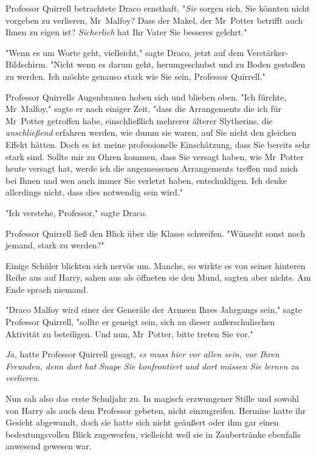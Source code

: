 {Professor Quirrell betrachtete Draco ernsthaft. "\emph{Sie} sorgen sich, Sie könnten nicht vorgeben zu verlieren, Mr~Malfoy? Dass der Makel, der Mr~Potter betrifft auch Ihnen zu eigen ist? \emph{Sicherlich} hat Ihr Vater Sie besseres gelehrt."

"Wenn es um Worte geht, vielleicht," sagte Draco, jetzt auf dem Verstärker-Bildschirm. "Nicht wenn es darum geht, herumgeschubst und zu Boden gestoßen zu werden. Ich möchte genauso stark wie Sie sein, Professor Quirrell."

Professor Quirrells Augenbrauen hoben sich und blieben oben. "Ich fürchte, Mr~Malfoy," sagte er nach einiger Zeit, "dass die Arrangements die ich für Mr~Potter getroffen habe, einschließlich mehrerer älterer Slytherins, die \emph{anschließend} erfahren werden, wie dumm sie waren, auf Sie nicht den gleichen Effekt hätten. Doch es ist meine professionelle Einschätzung, dass Sie bereits sehr stark sind. Sollte mir zu Ohren kommen, dass Sie versagt haben, wie Mr~Potter heute versagt hat, werde ich die angemessenen Arrangements treffen und mich bei Ihnen und wen auch immer Sie verletzt haben, entschuldigen. Ich denke allerdings nicht, dass dies notwendig sein wird."

"Ich verstehe, Professor," sagte Draco.

Professor Quirrell ließ den Blick über die Klasse schweifen. "Wünscht sonst noch jemand, stark zu werden?"

Einige Schüler blickten sich nervös um. Manche, so wirkte es von seiner hinteren Reihe aus auf Harry, sahen aus als öffneten sie den Mund, sagten aber nichts. Am Ende sprach niemand.

"Draco Malfoy wird einer der Generäle der Armeen Ihres Jahrgangs sein," sagte Professor Quirrell, "sollte er geneigt sein, sich an dieser außerschulischen Aktivität zu beteiligen. Und nun, Mr~Potter, bitte treten Sie vor."

\later

\emph{Ja,} hatte Professor Quirrell gesagt, \emph{es muss hier vor allen sein, vor Ihren Freunden, denn dort hat Snape Sie konfrontiert und dort müssen Sie lernen zu verlieren.}

Nun sah also das erste Schuljahr zu. In magisch erzwungener Stille und sowohl von Harry als auch dem Professor gebeten, nicht einzugreifen. Hermine hatte ihr Gesicht abgewandt, doch sie hatte sich nicht geäußert oder ihm gar einen bedeutungsvollen Blick zugeworfen, vielleicht weil sie in Zaubertränke ebenfalls anwesend gewesen war.

}
